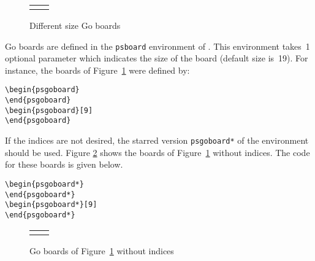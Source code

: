 \documentclass[a4paper]{article}
\begin{document}
\begin{figure}
\setgounit{0.3cm}
\begin{center}
\begin{tabular}{cc}
\begin{psgoboard}
\end{psgoboard} &
\begin{psgoboard}[9]
\end{psgoboard}
\end{tabular}
\caption{Different size Go boards}
\label{fig:empty:boards}
\end{center}
\end{figure}

Go boards are defined in the \verb|psboard| environment of \psgo. This
environment takes~1 optional parameter which indicates the size of the
board (default size is~19). For instance, the boards of
Figure~\ref{fig:empty:boards} were defined by:

\begin{verbatim}
\begin{psgoboard}
\end{psgoboard}
\begin{psgoboard}[9]
\end{psgoboard}
\end{verbatim}

If the indices are not desired, the starred version \verb|psgoboard*|
of the environment should be used. Figure \ref{fig:no:indices} shows
the boards of Figure~\ref{fig:empty:boards} without indices. The code
for these boards is given below.
\begin{verbatim}
\begin{psgoboard*}
\end{psgoboard*}
\begin{psgoboard*}[9]
\end{psgoboard*}
\end{verbatim}

\begin{figure}
\setgounit{0.3cm}
\begin{center}
\begin{tabular}{cc}
\begin{psgoboard*}
\end{psgoboard*} &
\begin{psgoboard*}[9]
\end{psgoboard*}
\end{tabular}
\caption{Go boards of Figure~\ref{fig:empty:boards} without indices}
\label{fig:no:indices}
\end{center}
\end{figure}
\end{document}
